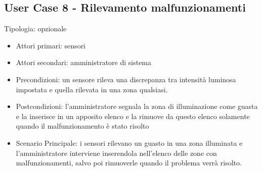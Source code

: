 \documentclass[12pt]{article}
\begin{document}
\subsection{User Case 8 - Rilevamento malfunzionamenti}
Tipologia: opzionale
\begin{itemize}
	\item Attori primari: sensori
	\item Attori secondari: amministratore di sistema
	\item Precondizioni: un sensore rileva una discrepanza tra intensità luminosa impostata e quella rilevata in una zona qualsiasi.
	\item Postcondizioni: l'amministratore segnala la zona di illuminazione come guasta e la inserisce in un apposito elenco e la rimuove da questo elenco solamente quando il malfunzionamento è stato risolto
	\item Scenario Principale: i sensori rilevano un guasto in una zona illuminata e l'amministratore interviene inserendola nell'elenco delle zone con malfunzionamenti, salvo poi rimuoverle quando il problema verrà risolto.
\end{itemize}
\end{document}
